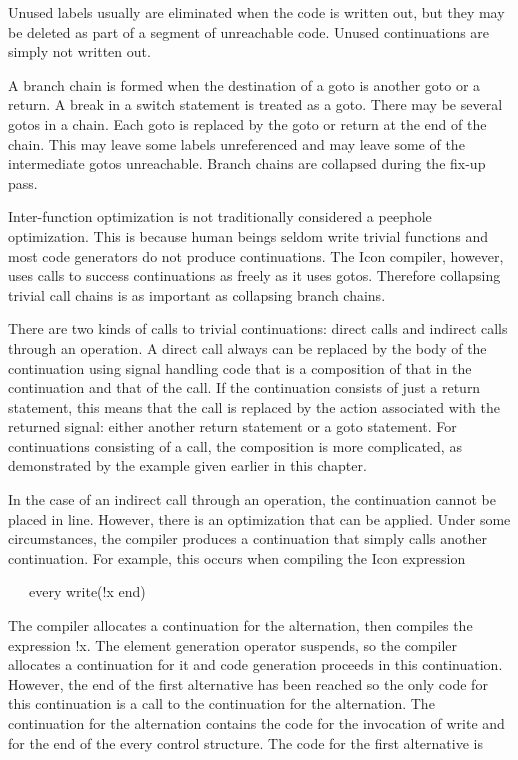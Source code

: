 Unused labels usually are eliminated when the code is written out, but
they may be deleted as part of a segment of unreachable code. Unused
continuations are simply not written out.

A branch chain is formed when the destination of a goto is another
goto or a return. A break in a switch statement is treated as a
goto. There may be several gotos in a chain. Each goto is replaced by
the goto or return at the end of the chain. This may leave some labels
unreferenced and may leave some of the intermediate gotos
unreachable. Branch chains are collapsed during the fix-up pass.

Inter-function optimization is not traditionally considered a peephole
optimization. This is because human beings seldom write trivial
functions and most code generators do not produce continuations. The
Icon compiler, however, uses calls to success continuations as freely
as it uses gotos. Therefore collapsing trivial call chains is as
important as collapsing branch chains.

There are two kinds of calls to trivial continuations: direct calls
and indirect calls through an operation. A direct call always can be
replaced by the body of the continuation using signal handling code
that is a composition of that in the continuation and that of the
call. If the continuation consists of just a return statement, this
means that the call is replaced by the action associated with the
returned signal: either another return statement or a goto
statement. For continuations consisting of a call, the composition is
more complicated, as demonstrated by the example given earlier in this
chapter.

In the case of an indirect call through an operation, the continuation
cannot be placed in line. However, there is an optimization that can
be applied. Under some circumstances, the compiler produces a
continuation that simply calls another continuation. For example, this
occurs when compiling the Icon expression

{\ttfamily\mdseries
\ \ \ every write(!x {\textbar} end)}

The compiler allocates a continuation for the alternation, then
compiles the expression !x. The element generation operator suspends,
so the compiler allocates a continuation for it and code generation
proceeds in this continuation.  However, the end of the first
alternative has been reached so the only code for this continuation is
a call to the continuation for the alternation. The continuation for
the alternation contains the code for the invocation of write and for
the end of the every control structure. The code for the first
alternative is

